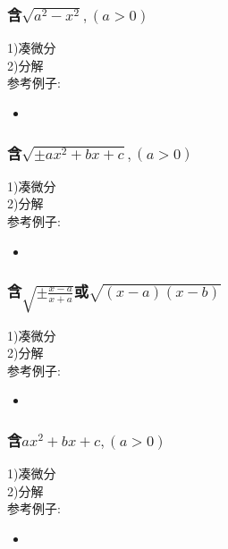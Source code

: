 \documentclass[fleqn]{article}
\begin{document}
\begin{flushleft}
		\subsubsection{含$\sqrt{a^2-x^2},(a>0)$}
		1)凑微分\\
		2)分解\\
		参考例子:\\
		\begin{itemize}
				\item 
		\end{itemize}
	\subsubsection{含$\sqrt{\pm ax^2+bx+c},(a>0)$}
		1)凑微分\\
		2)分解\\
		参考例子:\\
		\begin{itemize}
				\item 
		\end{itemize}
		\subsubsection{含$\sqrt{\pm \frac{x-a}{x+a}}$或$\sqrt{(x-a)(x-b)}$}
		1)凑微分\\
		2)分解\\
		参考例子:\\
		\begin{itemize}
				\item 
		\end{itemize}
		\subsubsection{含$ax^2+bx+c,(a>0)$}
		1)凑微分\\
		2)分解\\
		参考例子:\\
		\begin{itemize}
				\item 
		\end{itemize}
\end{flushleft}
\end{document}
